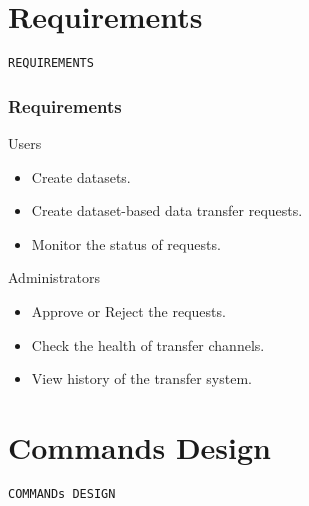 \documentclass[19pt]{beamer}
\begin{document}
\section{Requirements}

\begin{frame}
    \begin{center}
        \LARGE \tt{REQUIREMENTS}
    \end{center}
\end{frame}

\begin{frame}
    \frametitle{Requirements}
    \begin{block}{Users}
        \begin{itemize}
            \item Create datasets.
            \item Create dataset-based data transfer requests.
            \item Monitor the status of requests.
        \end{itemize}
    \end{block}
    \begin{block}{Administrators}
        \begin{itemize}
            \item Approve or Reject the requests.
            \item Check the health of transfer channels.
            \item View history of the transfer system.
        \end{itemize}
    \end{block}
\end{frame}

\section{Commands Design}

\begin{frame}
    \begin{center}
        \LARGE \tt{COMMANDs DESIGN}
    \end{center}
\end{frame}
\end{document}

